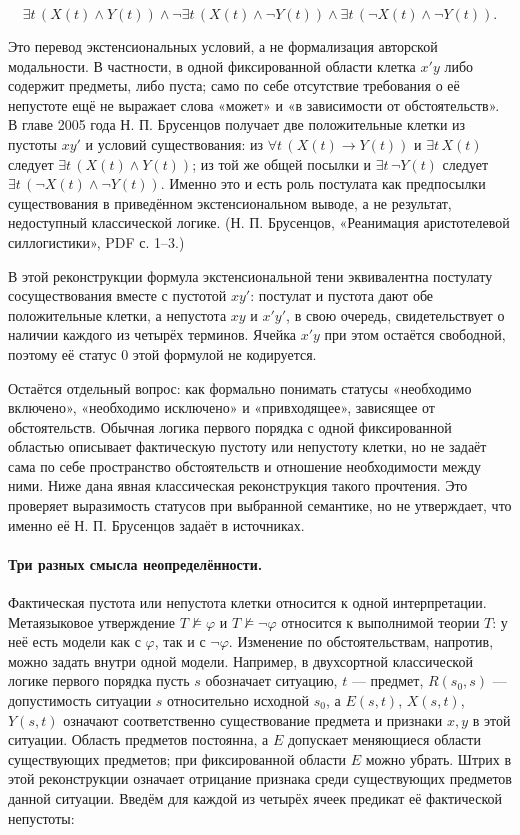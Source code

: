 \documentclass[12pt,a4paper]{article}
\begin{document}
\[
\exists t\,(X(t)\land Y(t))\land
\neg\exists t\,(X(t)\land\neg Y(t))\land
\exists t\,(\neg X(t)\land\neg Y(t)).
\]

Это перевод экстенсиональных условий, а не формализация авторской модальности. В частности, в одной фиксированной области клетка \(x'y\) либо содержит предметы, либо пуста; само по себе отсутствие требования о её непустоте ещё не выражает слова «может» и «в зависимости от обстоятельств». В главе 2005 года Н. П. Брусенцов получает две положительные клетки из пустоты \(xy'\) и условий существования: из \(\forall t\,(X(t)\to Y(t))\) и \(\exists t\,X(t)\) следует \(\exists t\,(X(t)\land Y(t))\); из той же общей посылки и \(\exists t\,\neg Y(t)\) следует \(\exists t\,(\neg X(t)\land\neg Y(t))\). Именно это и есть роль постулата как предпосылки существования в приведённом экстенсиональном выводе, а не результат, недоступный классической логике. (Н. П. Брусенцов, «Реанимация аристотелевой силлогистики», PDF с. 1–3.)

В этой реконструкции формула экстенсиональной тени эквивалентна постулату сосуществования вместе с пустотой \(xy'\): постулат и пустота дают обе положительные клетки, а непустота \(xy\) и \(x'y'\), в свою очередь, свидетельствует о наличии каждого из четырёх терминов. Ячейка \(x'y\) при этом остаётся свободной, поэтому её статус \(0\) этой формулой не кодируется.

Остаётся отдельный вопрос: как формально понимать статусы «необходимо включено», «необходимо исключено» и «привходящее», зависящее от обстоятельств. Обычная логика первого порядка с одной фиксированной областью описывает фактическую пустоту или непустоту клетки, но не задаёт сама по себе пространство обстоятельств и отношение необходимости между ними. Ниже дана явная классическая реконструкция такого прочтения. Это проверяет выразимость статусов при выбранной семантике, но не утверждает, что именно её Н. П. Брусенцов задаёт в источниках.

\paragraph{Три разных смысла неопределённости.} Фактическая пустота или непустота клетки относится к одной интерпретации. Метаязыковое утверждение \(T\not\models\varphi\) и \(T\not\models\neg\varphi\) относится к выполнимой теории \(T\): у неё есть модели как с \(\varphi\), так и с \(\neg\varphi\). Изменение по обстоятельствам, напротив, можно задать внутри одной модели. Например, в двухсортной классической логике первого порядка пусть \(s\) обозначает ситуацию, \(t\) — предмет, \(R(s_0,s)\) — допустимость ситуации \(s\) относительно исходной \(s_0\), а \(E(s,t)\), \(X(s,t)\), \(Y(s,t)\) означают соответственно существование предмета и признаки \(x,y\) в этой ситуации. Область предметов постоянна, а \(E\) допускает меняющиеся области существующих предметов; при фиксированной области \(E\) можно убрать. Штрих в этой реконструкции означает отрицание признака среди существующих предметов данной ситуации. Введём для каждой из четырёх ячеек предикат её фактической непустоты:
\end{document}

